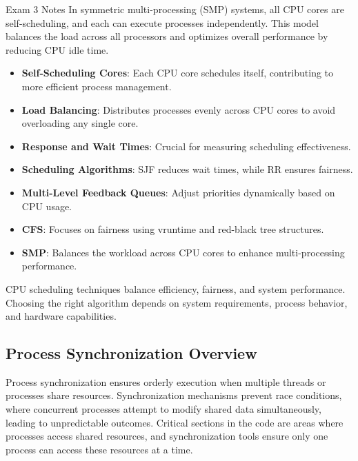 \begin{examnotes}{Exam 3 Notes}
    In symmetric multi-processing (SMP) systems, all CPU cores are self-scheduling, and each can execute processes independently. This model balances the load across all processors and optimizes overall performance by reducing CPU idle time.
    
    \begin{highlight}
        \begin{itemize}
            \item \textbf{Self-Scheduling Cores}: Each CPU core schedules itself, contributing to more efficient process management.
            \item \textbf{Load Balancing}: Distributes processes evenly across CPU cores to avoid overloading any single core.
        \end{itemize}
    \end{highlight}
    
    \begin{highlight}
        \begin{itemize}
            \item \textbf{Response and Wait Times}: Crucial for measuring scheduling effectiveness.
            \item \textbf{Scheduling Algorithms}: SJF reduces wait times, while RR ensures fairness.
            \item \textbf{Multi-Level Feedback Queues}: Adjust priorities dynamically based on CPU usage.
            \item \textbf{CFS}: Focuses on fairness using vruntime and red-black tree structures.
            \item \textbf{SMP}: Balances the workload across CPU cores to enhance multi-processing performance.
        \end{itemize}
    \end{highlight}
    
    CPU scheduling techniques balance efficiency, fairness, and system performance. Choosing the right algorithm depends on system requirements, process behavior, and hardware capabilities.

    \subsection*{Process Synchronization Overview}

    Process synchronization ensures orderly execution when multiple threads or processes share resources. Synchronization mechanisms prevent race conditions, where concurrent processes attempt to modify 
    shared data simultaneously, leading to unpredictable outcomes. Critical sections in the code are areas where processes access shared resources, and synchronization tools ensure only one process can 
    access these resources at a time.
    

\end{examnotes}
